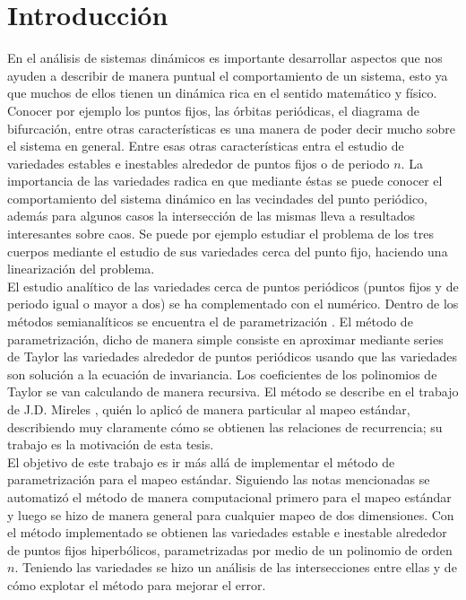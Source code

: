 
\chapter{Introducción}
En el análisis de sistemas dinámicos es importante desarrollar aspectos que nos ayuden a describir de manera puntual el comportamiento de un sistema, esto ya que muchos de ellos tienen un dinámica rica en el sentido matemático y físico. Conocer por ejemplo los puntos fijos, las órbitas periódicas, el diagrama de bifurcación, entre otras características es una manera de poder decir mucho sobre el sistema en general. Entre esas otras características entra el estudio de variedades estables e inestables alrededor de puntos fijos o de periodo $n$. La importancia de las variedades radica en que mediante éstas se puede conocer el comportamiento del sistema dinámico en las vecindades del punto periódico, además para algunos casos la intersección de las mismas lleva a resultados interesantes sobre caos. Se puede por ejemplo estudiar el problema de los tres cuerpos mediante el estudio de sus variedades cerca del punto fijo, haciendo una linearización del problema.\\


El estudio analítico de las variedades cerca de puntos periódicos (puntos fijos y de periodo igual o mayor a dos) se ha complementado con el numérico. Dentro de los métodos semianalíticos se encuentra el de parametrización \citep{Haro}. El método de parametrización, dicho de manera simple consiste en aproximar mediante series de Taylor las variedades alrededor de puntos periódicos usando que las variedades son solución a la ecuación de invariancia. Los coeficientes de los polinomios de Taylor se van calculando de manera recursiva. El método se describe en el trabajo de J.D. Mireles \citep{Mireles}, quién  lo aplicó de manera particular al mapeo estándar, describiendo muy claramente cómo se obtienen las relaciones de recurrencia; su trabajo es la motivación de esta tesis.\\


El objetivo de este trabajo es ir más allá de implementar el método de parametrización para el mapeo estándar. Siguiendo las notas mencionadas se automatizó el método de manera computacional primero para el mapeo estándar y luego se hizo de manera general para cualquier mapeo de dos dimensiones. Con el método implementado se obtienen las variedades estable e inestable alrededor de puntos fijos hiperbólicos, parametrizadas por medio de un polinomio de orden $n$.
Teniendo las variedades se hizo un análisis de las intersecciones entre ellas y de cómo explotar el método para mejorar el error.
 
